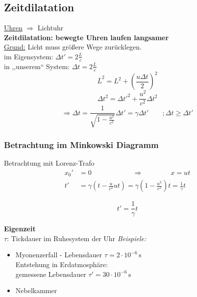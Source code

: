 \documentclass[titlepage,11pt,a4paper,ngerman]{report}
\newcommand{\tx}[1]{\textrm{#1}}
\newcommand{\frbox}[2]{\begin{tcolorbox}[colback=white,colframe=red!75!black,fonttitle=\bfseries,title=#1]#2\end{tcolorbox}}
\begin{document}
\subsection{Zeitdilatation}
\underline{Uhren} $ \Rightarrow $ Lichtuhr\\
\textbf{Zeitdilatation: bewegte Uhren laufen langsamer}\\
\underline{Grund:} Licht muss größere Wege zurücklegen.\\[5pt]
im Eigensystem: $ \Delta t' = 2 \frac{L}{c} $\\
in ,,unserem`` System: $ \Delta t = 2 \frac{\overline{L}}{c} $
\begin{equation*}
\overline{L}^2 = L^2 + \left(\frac{u \Delta t}{2}\right)^2
\end{equation*}
\begin{equation*}
\Delta t^2 = \Delta t'^2 + \frac{u^2}{c^2} \Delta t^2
\end{equation*}
\begin{equation*}
\Rightarrow \Delta t = \frac{1}{\sqrt{1 - \frac{u^2}{c^2}}} \Delta t' = \gamma \Delta t' \qquad ; \Delta t \geq \Delta t'
\end{equation*}

\subsubsection{Betrachtung im Minkowski Diagramm}
Betrachtung mit Lorenz-Trafo
\begin{align*}
x_0' &= 0 \qquad  \qquad \qquad  \Rightarrow  \qquad \qquad  x = ut \\
t'\phantom{_0} &= \gamma \left(t - \frac{u}{c^2}  u t\right) = \gamma \left(1 - \frac{u^2}{c^2}\right) t = \frac{1}{\gamma} t
\end{align*}
\frbox{Zeitdilatation}{\begin{equation*}
	t' = \frac{1}{\gamma} t
	\end{equation*}}
\textbf{Eigenzeit}\\
$ \tau $: Tickdauer im Ruhesystem der Uhr
\emph{Beispiele:}
\begin{itemize}
	\item Myonenzerfall - Lebensdauer $ \tau = 2 \cdot 10^{-6} \, \tx{s} $\\
	Entstehung in Erdatmosphäre:\\
	gemessene Lebensdauer $ \tau' = 30 \cdot 10^{-6} \, \tx{s} $
	\item Nebelkammer
\end{itemize}
\end{document}
